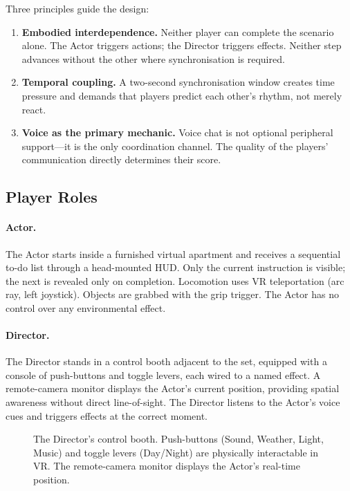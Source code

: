 \documentclass[12pt,a4paper]{article}
\begin{document}
Three principles guide the design:

\begin{enumerate}[leftmargin=1.8em, itemsep=3pt]
  \item \textbf{Embodied interdependence.} Neither player can complete the scenario alone. The Actor triggers actions; the Director triggers effects. Neither step advances without the other where synchronisation is required.
  \item \textbf{Temporal coupling.} A two-second synchronisation window creates time pressure and demands that players predict each other's rhythm, not merely react.
  \item \textbf{Voice as the primary mechanic.} Voice chat is not optional peripheral support---it is the only coordination channel. The quality of the players' communication directly determines their score.
\end{enumerate}

\subsection{Player Roles}

\paragraph{Actor.} The Actor starts inside a furnished virtual apartment and receives a sequential to-do list through a head-mounted HUD. Only the current instruction is visible; the next is revealed only on completion. Locomotion uses VR teleportation (arc ray, left joystick). Objects are grabbed with the grip trigger. The Actor has no control over any environmental effect.

\paragraph{Director.} The Director stands in a control booth adjacent to the set, equipped with a console of push-buttons and toggle levers, each wired to a named effect. A remote-camera monitor displays the Actor's current position, providing spatial awareness without direct line-of-sight. The Director listens to the Actor's voice cues and triggers effects at the correct moment.

\begin{figure}[H]
  \centering
  \caption{The Director's control booth. Push-buttons (Sound, Weather, Light, Music) and toggle levers (Day/Night) are physically interactable in VR. The remote-camera monitor displays the Actor's real-time position.}
  \label{fig:booth}
\end{figure}
\end{document}
